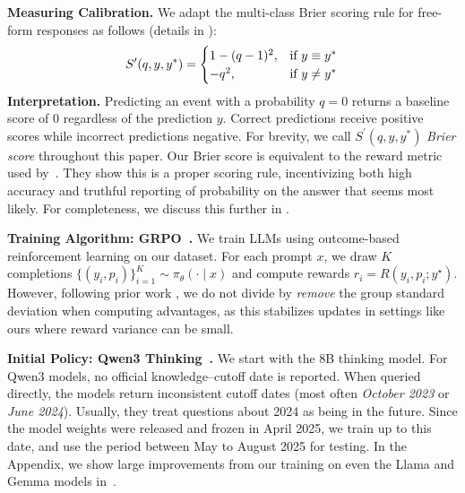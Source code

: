 \textbf{Measuring Calibration.} We adapt the multi-class Brier scoring rule \citep{mucsanyi2023trustworthy} for free-form responses as follows (details in ):
$$
S^\prime(q, y, y^*) = \begin{cases}
    1 -(q - 1)^2, & \text{if } y \equiv y^*\\
     - q^2, & \text{if } y \neq y^*
    \end{cases} \\
    \label{eq:rlcr}
$$
 \textbf{Interpretation.} Predicting an event with a probability $q=0$ returns a baseline score of $0$ regardless of the prediction $y$. Correct predictions receive positive scores while incorrect predictions negative. For brevity, we call $S^\prime(q, y, y^*)$ \emph{Brier score} throughout this paper. Our Brier score is equivalent to the reward metric used by~\citet{damani2025beyond}. They show this is a proper scoring rule, incentivizing both high accuracy and truthful reporting of probability on the answer that seems most likely. For completeness, we discuss this further in .\vspace{0.15cm} 

\textbf{Training Algorithm: GRPO~\citep{shao2024deepseekmath}.} 
We train LLMs using outcome-based reinforcement learning on our dataset. For each prompt $x$, we draw $K$ completions $\{(y_i,p_i)\}_{i=1}^K \sim \pi_\theta(\cdot\mid x)$ and compute rewards $r_i=R(y_i,p_i;y^\star)$. However, following prior work \citep{damani2025beyond, turtel2025outcome}, we do not divide by \emph{remove} the group standard deviation when computing advantages, as this stabilizes updates in settings like ours where reward variance can be small. \vspace{0.15cm} 

\textbf{Initial Policy: Qwen3 Thinking~\citep{yang2025qwen3technicalreport}.} We start with the 8B thinking model. For Qwen3 models, no official knowledge–cutoff date is reported. When queried directly, the models return inconsistent cutoff dates (most often \emph{October 2023} or \emph{June 2024}). Usually, they treat questions about 2024 as being in the future. Since the model weights were released and frozen in April 2025, we train up to this date, and use the period between May to August 2025 for testing. In the Appendix, we show large improvements from our training on even the Llama and Gemma models in~.
